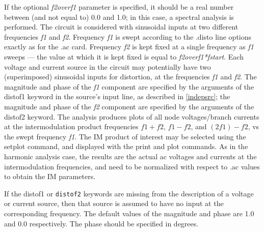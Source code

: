 If the optional {\it f2overf1} parameter is specified, it should be a
real number between (and not equal to) 0.0 and 1.0; in this case, a
spectral analysis is performed.  The circuit is considered with
sinusoidal inputs at two different frequencies {\it f1} and {\it f2}. 
Frequency {\it f1} is swept according to the {\vt .disto} line options
exactly as for the {\vt .ac} card.  Frequency {\it f2} is kept fixed
at a single frequency as {\it f1} sweeps --- the value at which it is
kept fixed is equal to {\it f2overf1*fstart\/}.  Each voltage and
current source in the circuit may potentially have two (superimposed)
sinusoidal inputs for distortion, at the frequencies {\it f1} and {\it
f2}.  The magnitude and phase of the {\it f1} component are specified
by the arguments of the {\vt distof1} keyword in the source's input
line, as described in \ref{indepsrc}; the magnitude and phase of the
{\it f2} component are specified by the arguments of the {\vt distof2}
keyword.  The analysis produces plots of all node voltages/branch
currents at the intermodulation product frequencies $f1+f2$, $f1-f2$,
and $(2f1)-f2$, vs the swept frequency {\it f1}.  The IM product of
interest may be selected using the {\cb setplot} command, and
displayed with the {\cb print} and {\cb plot} commands.  As in the
harmonic analysis case, the results are the actual ac voltages and
currents at the intermodulation frequencies, and need to be normalized
with respect to {\vt .ac} values to obtain the IM parameters.

If the {\vt distof1} or {\tt distof2} keywords are missing from the
description of a voltage or current source, then that source is
assumed to have no input at the corresponding frequency.  The default
values of the magnitude and phase are 1.0 and 0.0 respectively.  The
phase should be specified in degrees.

